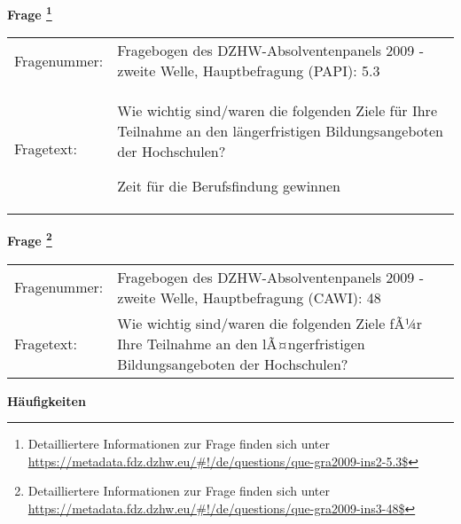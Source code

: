 				\vspace*{0.5cm}
                \noindent\textbf{Frage
	                \footnote{Detailliertere Informationen zur Frage finden sich unter
		              \url{https://metadata.fdz.dzhw.eu/\#!/de/questions/que-gra2009-ins2-5.3$}}}\\
				\begin{tabularx}{\hsize}{@{}lX}
					Fragenummer: &
					  Fragebogen des DZHW-Absolventenpanels 2009 - zweite Welle, Hauptbefragung (PAPI):
					  5.3
 \\
					Fragetext: & Wie wichtig sind/waren die folgenden Ziele für Ihre Teilnahme an den längerfristigen Bildungsangeboten der Hochschulen?\par  Zeit für die Berufsfindung gewinnen \\
				\end{tabularx}
				\vspace*{0.5cm}
                \noindent\textbf{Frage
	                \footnote{Detailliertere Informationen zur Frage finden sich unter
		              \url{https://metadata.fdz.dzhw.eu/\#!/de/questions/que-gra2009-ins3-48$}}}\\
				\begin{tabularx}{\hsize}{@{}lX}
					Fragenummer: &
					  Fragebogen des DZHW-Absolventenpanels 2009 - zweite Welle, Hauptbefragung (CAWI):
					  48
 \\
					Fragetext: & Wie wichtig sind/waren die folgenden Ziele fÃ¼r Ihre Teilnahme an den lÃ¤ngerfristigen Bildungsangeboten der Hochschulen? \\
				\end{tabularx}





        		\vspace*{0.5cm}
                \noindent\textbf{Häufigkeiten}

